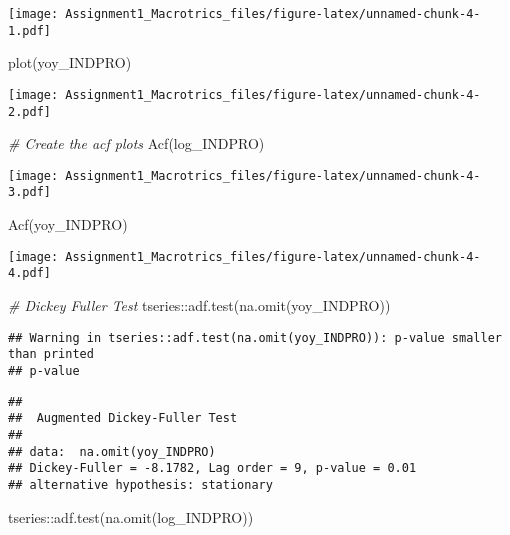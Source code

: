 \documentclass[
]{article}
\newenvironment{Shaded}{\begin{snugshade}}{\end{snugshade}}
\newcommand{\CommentTok}[1]{\textcolor[rgb]{0.56,0.35,0.01}{\textit{#1}}}
\newcommand{\FunctionTok}[1]{\textcolor[rgb]{0.00,0.00,0.00}{#1}}
\newcommand{\NormalTok}[1]{#1}
\newcommand{\SpecialCharTok}[1]{\textcolor[rgb]{0.00,0.00,0.00}{#1}}
\begin{document}
\texttt{[image: Assignment1\_Macrotrics\_files/figure-latex/unnamed-chunk-4-1.pdf]}

\begin{Shaded}
\begin{Highlighting}[]
\FunctionTok{plot}\NormalTok{(yoy\_INDPRO)}
\end{Highlighting}
\end{Shaded}

\texttt{[image: Assignment1\_Macrotrics\_files/figure-latex/unnamed-chunk-4-2.pdf]}

\begin{Shaded}
\begin{Highlighting}[]
\CommentTok{\# Create the acf plots}
\FunctionTok{Acf}\NormalTok{(log\_INDPRO)}
\end{Highlighting}
\end{Shaded}

\texttt{[image: Assignment1\_Macrotrics\_files/figure-latex/unnamed-chunk-4-3.pdf]}

\begin{Shaded}
\begin{Highlighting}[]
\FunctionTok{Acf}\NormalTok{(yoy\_INDPRO)}
\end{Highlighting}
\end{Shaded}

\texttt{[image: Assignment1\_Macrotrics\_files/figure-latex/unnamed-chunk-4-4.pdf]}

\begin{Shaded}
\begin{Highlighting}[]
\CommentTok{\# Dickey Fuller Test}
\NormalTok{tseries}\SpecialCharTok{::}\FunctionTok{adf.test}\NormalTok{(}\FunctionTok{na.omit}\NormalTok{(yoy\_INDPRO))}
\end{Highlighting}
\end{Shaded}

\begin{verbatim}
## Warning in tseries::adf.test(na.omit(yoy_INDPRO)): p-value smaller than printed
## p-value
\end{verbatim}

\begin{verbatim}
## 
##  Augmented Dickey-Fuller Test
## 
## data:  na.omit(yoy_INDPRO)
## Dickey-Fuller = -8.1782, Lag order = 9, p-value = 0.01
## alternative hypothesis: stationary
\end{verbatim}

\begin{Shaded}
\begin{Highlighting}[]
\NormalTok{tseries}\SpecialCharTok{::}\FunctionTok{adf.test}\NormalTok{(}\FunctionTok{na.omit}\NormalTok{(log\_INDPRO))}
\end{Highlighting}
\end{Shaded}
\end{document}

